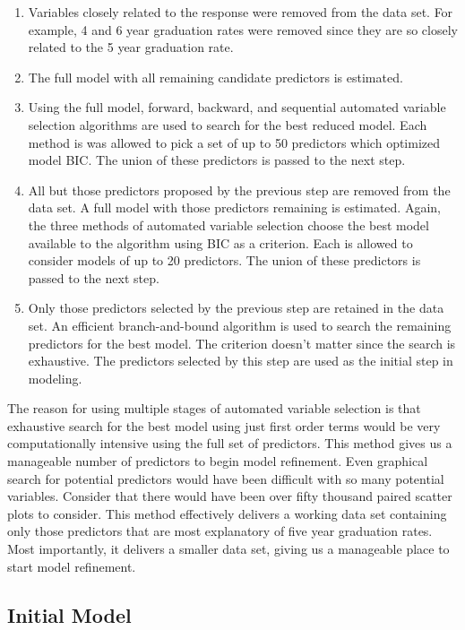 \documentclass{article}
\begin{document}
\begin{enumerate}[1)]
\item{} Variables closely related to the response were removed from the data set. For example, 4 and 6 year graduation rates were removed since they are so closely related to the 5 year graduation rate.
\item{} The full model with all remaining candidate predictors is estimated.
\item{} Using the full model, forward, backward, and sequential automated variable selection algorithms are used to search for the best reduced model. Each method is was allowed to pick a set of up to 50 predictors which optimized model BIC. The union of these predictors is passed to the next step.
\item{} All but those predictors proposed by the previous step are removed from the data set. A full model with those predictors remaining is estimated. Again, the three methods of automated variable selection choose the best model available to the algorithm using BIC as a criterion. Each is allowed to consider models of up to 20 predictors. The union of these predictors is passed to the next step.
\item{} Only those predictors selected by the previous step are retained in the data set. An efficient branch-and-bound algorithm is used to search the remaining predictors for the best model. The criterion doesn't matter since the search is exhaustive. The predictors selected by this step are used as the initial step in modeling.
\end{enumerate}

The reason for using multiple stages of automated variable selection is that exhaustive search for the best model using just first order terms would be very computationally intensive using the full set of predictors. This method gives us a manageable number of predictors to begin model refinement. Even graphical search for potential predictors would have been difficult with so many potential variables. Consider that there would have been over fifty thousand paired scatter plots to consider. This method effectively delivers a working data set containing only those predictors that are most explanatory of five year graduation rates. Most importantly, it delivers a smaller data set, giving us a manageable place to start model refinement.

\subsection{Initial Model}
\end{document}
